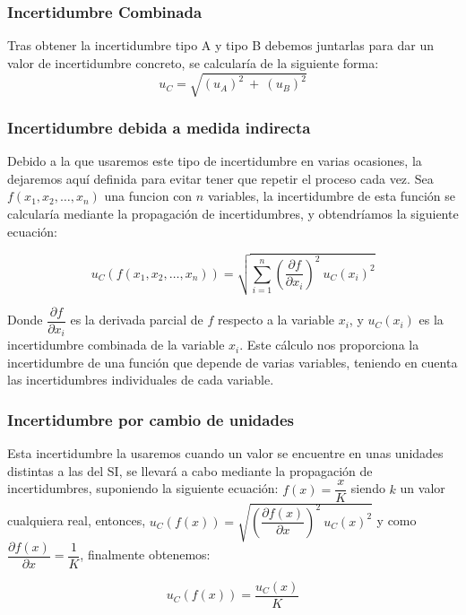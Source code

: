 \documentclass[10pt,onecolumn]{article}
\begin{document}
\subsubsection{Incertidumbre Combinada}
Tras obtener la incertidumbre tipo A y tipo B debemos juntarlas para dar un valor de incertidumbre concreto, se calcularía de la siguiente forma:
\begin{equation}
    u_C = \sqrt{(u_A)^2\ +\ (u_B)^2}
\end{equation}

\subsubsection{Incertidumbre debida a medida indirecta}
Debido a la que usaremos este tipo de incertidumbre en varias ocasiones, la dejaremos aquí definida para evitar 
tener que repetir el proceso cada vez. Sea $f(x_1,x_2,\ldots,x_n)$ una funcion con $n$ variables, la incertidumbre
de esta función se calcularía mediante la propagación de incertidumbres, y obtendríamos la siguiente ecuación:

\begin{equation}
    \boxed{u_C(f(x_1,x_2,\ldots,x_n)) = \sqrt{\sum_{i=1}^{n} \left(\dfrac{\partial f}{\partial x_i}\right)^2\ u_C(x_i)^2}}
\end{equation}

Donde $\dfrac{\partial f}{\partial x_i}$ es la derivada parcial de $f$ respecto a la variable $x_i$, y $u_C(x_i)$ es la incertidumbre combinada de la variable $x_i$.
Este cálculo nos proporciona la incertidumbre de una función que depende de varias variables, teniendo en cuenta las incertidumbres individuales de cada variable.
\subsubsection{Incertidumbre por cambio de unidades}
Esta incertidumbre la usaremos cuando un valor se encuentre en unas unidades distintas a las del SI, 
se llevará a cabo mediante la propagación de incertidumbres, suponiendo  la siguiente ecuación: 
$f(x) = \dfrac{x}{K}$ siendo $k$ un valor cualquiera real, entonces, $u_C(f(x)) = \sqrt{(\dfrac{\partial f(x)}{\partial x})^2\ u_C(x)^2}$ 
y como $\dfrac{\partial f(x)}{\partial x} = \dfrac{1}{K}$, finalmente obtenemos:

\begin{equation}
    \boxed{u_C(f(x)) = \dfrac{u_C(x)}{K}}
\end{equation}
\end{document}
